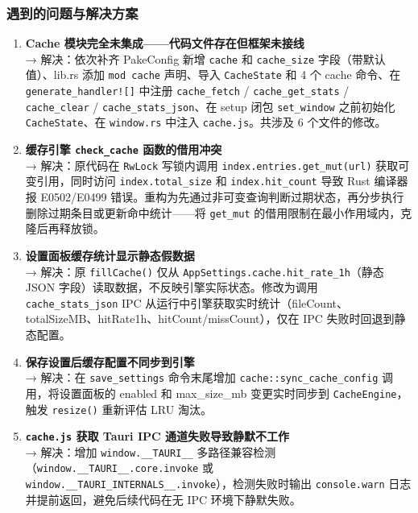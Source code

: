 \documentclass[12pt,a4paper]{ctexart}
\begin{document}
\subsubsection{遇到的问题与解决方案}

\begin{enumerate}[label=(\arabic*)]
  \item \textbf{Cache 模块完全未集成——代码文件存在但框架未接线}
    \\→ 解决：依次补齐 PakeConfig 新增 \texttt{cache} 和 \texttt{cache\_size} 字段（带默认值）、lib.rs 添加 \texttt{mod cache} 声明、导入 \texttt{CacheState} 和 4 个 cache 命令、在 \texttt{generate\_handler![]} 中注册 \texttt{cache\_fetch} / \texttt{cache\_get\_stats} / \texttt{cache\_clear} / \texttt{cache\_stats\_json}、在 setup 闭包 \texttt{set\_window} 之前初始化 \texttt{CacheState}、在 \texttt{window.rs} 中注入 \texttt{cache.js}。共涉及 6 个文件的修改。

  \item \textbf{缓存引擎 \texttt{check\_cache} 函数的借用冲突}
    \\→ 解决：原代码在 \texttt{RwLock} 写锁内调用 \texttt{index.entries.get\_mut(url)} 获取可变引用，同时访问 \texttt{index.total\_size} 和 \texttt{index.hit\_count} 导致 Rust 编译器报 E0502/E0499 错误。重构为先通过非可变查询判断过期状态，再分步执行删除过期条目或更新命中统计——将 \texttt{get\_mut} 的借用限制在最小作用域内，克隆后再释放锁。

  \item \textbf{设置面板缓存统计显示静态假数据}
    \\→ 解决：原 \texttt{fillCache()} 仅从 \texttt{AppSettings.cache.hit\_rate\_1h}（静态 JSON 字段）读取数据，不反映引擎实际状态。修改为调用 \texttt{cache\_stats\_json} IPC 从运行中引擎获取实时统计（fileCount、totalSizeMB、hitRate1h、hitCount/missCount），仅在 IPC 失败时回退到静态配置。

  \item \textbf{保存设置后缓存配置不同步到引擎}
    \\→ 解决：在 \texttt{save\_settings} 命令末尾增加 \texttt{cache::sync\_cache\_config} 调用，将设置面板的 enabled 和 max\_size\_mb 变更实时同步到 \texttt{CacheEngine}，触发 \texttt{resize()} 重新评估 LRU 淘汰。

  \item \textbf{\texttt{cache.js} 获取 Tauri IPC 通道失败导致静默不工作}
    \\→ 解决：增加 \texttt{window.\_\_TAURI\_\_} 多路径兼容检测（\texttt{window.\_\_TAURI\_\_.core.invoke} 或 \texttt{window.\_\_TAURI\_INTERNALS\_\_.invoke}），检测失败时输出 \texttt{console.warn} 日志并提前返回，避免后续代码在无 IPC 环境下静默失败。


\end{enumerate}
\end{document}
